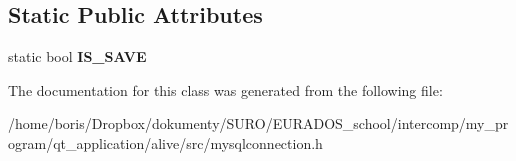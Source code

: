 \subsection*{Static Public Attributes}
\begin{DoxyCompactItemize}
\item 
\hypertarget{classMySqlConnection_acad0e08207666c8a8fe967c1193857da}{static bool {\bfseries I\-S\-\_\-\-S\-A\-V\-E}}\label{classMySqlConnection_acad0e08207666c8a8fe967c1193857da}

\end{DoxyCompactItemize}


The documentation for this class was generated from the following file\-:\begin{DoxyCompactItemize}
\item 
/home/boris/\-Dropbox/dokumenty/\-S\-U\-R\-O/\-E\-U\-R\-A\-D\-O\-S\-\_\-school/intercomp/my\-\_\-program/qt\-\_\-application/alive/src/mysqlconnection.\-h\end{DoxyCompactItemize}
